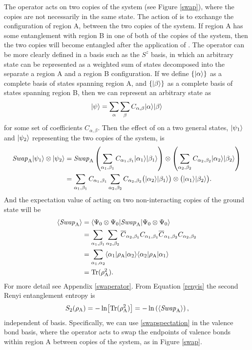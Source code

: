 The \swa operator acts on two copies of the system (see Figure \ref{swap}), where the copies are not necessarily in the same state.  The action of \swa is to exchange the configuration of region A, between the two copies of the system.  If region A has some entanglement with region B in one of both of the copies of the system, then the two copies will become entangled after the application of \swA.
The \swa operator can be more clearly defined in a basis such as the $S^z$ basis, in which an arbitrary state can be represented as a weighted sum of states decomposed into the separate a region A and a region B configuration.  
If we define $\{\lvert {\alpha} \rangle\}$ as a complete basis of states spanning region A, and $\{\lvert {\beta} \rangle\}$ as a complete basis of states spanning region B, then we can represent an arbitrary state as
\begin{equation}
	\lvert {\psi} \rangle = \sum_{\alpha}\sum_{\beta} C_{\alpha,\beta}\lvert {\alpha} \rangle\lvert {\beta} \rangle
\end{equation}
for some set of coefficients $C_{\alpha,\beta}$.  
Then the effect of \swa on a two general states, $\lvert {\psi_1} \rangle$ and $\lvert {\psi_2} \rangle$ representing the two copies of the system, is
\begin{align}
	{\it Swap}_{\rm A} \lvert {\psi_1} \rangle \otimes \lvert {\psi_2} \rangle  &= 
		{\it Swap}_{\rm A} \left(\sum_{\alpha_1,\beta_1} 
		C_{\alpha_1,\beta_1}\lvert {\alpha_1} \rangle\lvert {\beta_1} \rangle\right) \otimes
			\left(\sum_{\alpha_2,\beta_2} 
		C_{\alpha_2,\beta_2}\lvert {\alpha_2} \rangle\lvert {\beta_2} \rangle\right) \\
			&=\sum_{\alpha_1,\beta_1}C_{\alpha_1,\beta_1}\sum_{\alpha_2,\beta_2} 
			C_{\alpha_2,\beta_2}
			\big(\lvert {\alpha_2} \rangle\lvert {\beta_1} \rangle\big)\otimes\big(\lvert {\alpha_1} \rangle\lvert {\beta_2} \rangle\big).
\end{align}
And the expectation value of \swa acting on two non-interacting copies of the ground state will be
\begin{align}
\langle {\it Swap}_{\rm A} \rangle &=
\langle {\Psi_0\otimes\Psi_0} \rvert{\it Swap}_{\rm A} \lvert {\Psi_0\otimes\Psi_0} \rangle \\ 
	&=\sum_{\alpha_1,\beta_1} \sum_{\alpha_2,\beta_2}
		\overline{C}_{\alpha_2,\beta_1}C_{\alpha_1,\beta_1}
		\overline{C}_{\alpha_1,\beta_2}C_{\alpha_2,\beta_2}\\
	&=\sum_{\alpha_1,\alpha_2} \langle {\alpha_1} \rvert\rho_{\rm A} \lvert {\alpha_2} \rangle 
					\langle {\alpha_2} \rvert\rho_{\rm A} \lvert {\alpha_1} \rangle\\
	&={\rm Tr (\rho_A^2)}.
\end{align}
For more detail see Appendix \ref{swaperator}.  From Equation \eqref{renyis} the second Renyi entanglement entropy is
\begin{equation}
	S_2(\rho_{\rm A}) = -\ln\!\left[{\rm Tr}(\rho_{\rm A}^2)\right] = -\ln\left( \langle {\it Swap}_{\rm A} \rangle \right), \label{swapspectation}
\end{equation}
independent of basis.  Specifically, we can use \eqref{swapspectation} in the valence bond basis, where the \swa operator acts to swap the endpoints of valence bonds within region A between copies of the system, as in Figure \ref{swap}.

